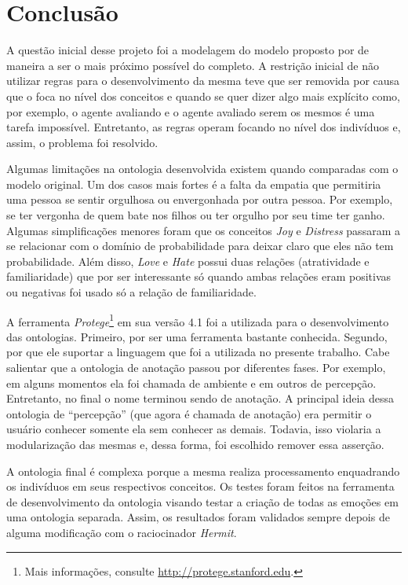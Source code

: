 \chapter{Conclusão} \label{cap:c}

A questão inicial desse projeto foi a modelagem do modelo proposto por
\citet{ortony1988cse} de maneira a ser o mais próximo possível do completo. A
restrição inicial de não utilizar regras para o desenvolvimento da mesma teve
que ser removida por causa que o \OWL foca no nível dos conceitos e quando se
quer dizer algo mais explícito como, por exemplo, o agente avaliando e o
agente avaliado serem os mesmos é uma tarefa impossível. Entretanto, as regras
operam focando no nível dos indivíduos e, assim, o problema foi resolvido.

Algumas limitações na ontologia desenvolvida existem quando comparadas com o
modelo original. Um dos casos mais fortes é a falta da empatia que permitiria
uma pessoa se sentir orgulhosa ou envergonhada por outra pessoa. Por exemplo,
se ter vergonha de quem bate nos filhos ou ter orgulho por seu time ter ganho.
Algumas simplificações menores foram que os conceitos \emph{Joy} e
\emph{Distress} passaram a se relacionar com o domínio de probabilidade para
deixar claro que eles não tem probabilidade. Além disso, \emph{Love} e
\emph{Hate} possui duas relações (atratividade e familiaridade) que por ser
interessante só quando ambas relações eram positivas ou negativas foi usado só
a relação de familiaridade.

A ferramenta \emph{Protege}\footnote{Mais informações, consulte \url{http://protege.stanford.edu}.}
em sua versão 4.1 foi a utilizada para o desenvolvimento das ontologias.
Primeiro, por ser uma ferramenta bastante conhecida. Segundo, por que ele
suportar a linguagem  que foi a utilizada no presente trabalho.
%
Cabe salientar que a ontologia de anotação passou por diferentes fases. Por
exemplo, em alguns momentos ela foi chamada de ambiente e em outros de
percepção. Entretanto, no final o nome terminou sendo de anotação. A principal
ideia dessa ontologia de ``percepção'' (que agora é chamada de anotação) era
permitir o usuário conhecer somente ela sem conhecer as demais. Todavia, isso
violaria a modularização das mesmas e, dessa forma, foi escolhido remover essa
asserção.

A ontologia final é complexa porque a mesma realiza processamento enquadrando
os indivíduos em seus respectivos conceitos. Os testes foram feitos na
ferramenta de desenvolvimento da ontologia visando testar a criação de todas
as emoções em uma ontologia separada. Assim, os resultados foram validados
sempre depois de alguma modificação com o raciocinador \emph{Hermit}.

